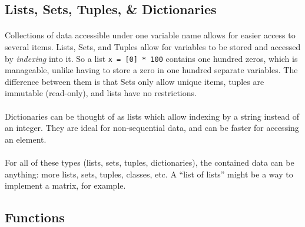 \documentclass[letter,10pt]{article}
\begin{document}
\subsection{Lists, Sets, Tuples, \& Dictionaries}
\paragraph{}Collections of data accessible under one variable name allows for easier access to several items. Lists, Sets, and Tuples allow for variables to be stored and accessed by \textit{indexing} into it. So a list \verb|x = [0] * 100| contains one hundred zeros, which is manageable, unlike having to store a zero in one hundred separate variables. The difference between them is that Sets only allow unique items, tuples are immutable (read-only), and lists have no restrictions.

\paragraph{}Dictionaries can be thought of as lists which allow indexing by a string instead of an integer. They are ideal for non-sequential data, and can be faster for accessing an element.

\paragraph{}For all of these types (lists, sets, tuples, dictionaries), the contained data can be anything: more lists, sets, tuples, classes, etc. A ``list of lists'' might be a way to implement a matrix, for example.

\subsection{Functions}
\end{document}
